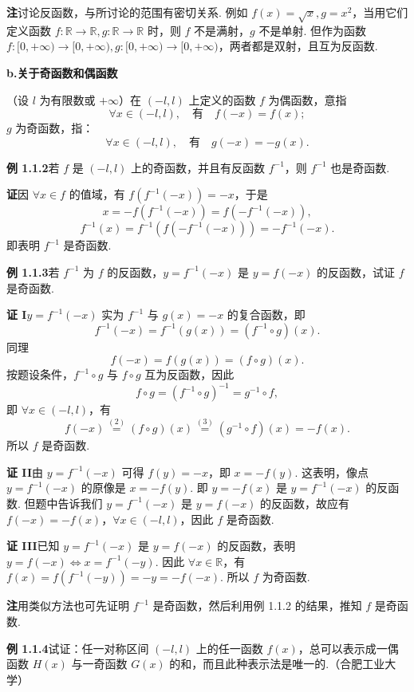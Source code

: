 \documentclass[UTF8, 12pt, fontset=fandol, oneside]{ctexart}
\begin{document}
\noindent\textbf{注}\quad 讨论反函数，与所讨论的范围有密切关系. 例如 $f(x)=\sqrt{x},g=x^2$，当用它们定义函数 $f:\mathbb{R}\to\mathbb{R},g:\mathbb{R}\to\mathbb{R}$ 时，则 $f$ 不是满射，$g$ 不是单射. 但作为函数 $f:[0,+\infty)\to[0,+\infty),g:[0,+\infty)\to[0,+\infty)$，两者都是双射，且互为反函数.

\noindent\textbf{b.\quad 关于奇函数和偶函数}

（设 $l$ 为有限数或 $+\infty$）在 $(-l,l)$ 上定义的函数 $f$ 为偶函数，意指
\[
  \forall x\in(-l,l),\quad \text{有}\quad f(-x)=f(x);
\]
$g$ 为奇函数，指：
\[
  \forall x\in(-l,l),\quad \text{有}\quad g(-x)=-g(x).
\]

\noindent\textbf{例 1.1.2}\quad 若 $f$ 是 $(-l,l)$ 上的奇函数，并且有反函数 $f^{-1}$，则 $f^{-1}$ 也是奇函数.

\noindent\textbf{证}\quad 因 $\forall x\in f$ 的值域，有 $f(f^{-1}(-x))=-x$，于是
\[
  x=-f(f^{-1}(-x))=f(-f^{-1}(-x)),
\]
\[
  f^{-1}(x)=f^{-1}(f(-f^{-1}(-x)))=-f^{-1}(-x).
\]
即表明 $f^{-1}$ 是奇函数.

\noindent\textbf{例 1.1.3}\quad 若 $f^{-1}$ 为 $f$ 的反函数，$y=f^{-1}(-x)$ 是 $y=f(-x)$ 的反函数，试证 $f$ 是奇函数.

\noindent\textbf{证 I}\quad $y=f^{-1}(-x)$ 实为 $f^{-1}$ 与 $g(x)=-x$ 的复合函数，即
\[
  f^{-1}(-x)=f^{-1}(g(x))=(f^{-1}\circ g)(x).
\tag{1}
\]
同理
\[
  f(-x)=f(g(x))=(f\circ g)(x).
\tag{2}
\]
按题设条件，$f^{-1}\circ g$ 与 $f\circ g$ 互为反函数，因此
\[
  f\circ g=(f^{-1}\circ g)^{-1}=g^{-1}\circ f,
\tag{3}
\]
即 $\forall x\in(-l,l)$，有
\[
  f(-x)\stackrel{(2)}{=}(f\circ g)(x)\stackrel{(3)}{=}(g^{-1}\circ f)(x)=-f(x).
\]
所以 $f$ 是奇函数.

\noindent\textbf{证 II}\quad 由 $y=f^{-1}(-x)$ 可得 $f(y)=-x$，即 $x=-f(y)$. 这表明，像点 $y=f^{-1}(-x)$ 的原像是 $x=-f(y)$. 即 $y=-f(x)$ 是 $y=f^{-1}(-x)$ 的反函数. 但题中告诉我们 $y=f^{-1}(-x)$ 是 $y=f(-x)$ 的反函数，故应有 $f(-x)=-f(x)$，$\forall x\in(-l,l)$，因此 $f$ 是奇函数.

\noindent\textbf{证 III}\quad 已知 $y=f^{-1}(-x)$ 是 $y=f(-x)$ 的反函数，表明 $y=f(-x)\Leftrightarrow x=f^{-1}(-y)$. 因此 $\forall x\in\mathbb{R}$，有 $f(x)=f(f^{-1}(-y))=-y=-f(-x)$. 所以 $f$ 为奇函数.

\noindent\textbf{注}\quad 用类似方法也可先证明 $f^{-1}$ 是奇函数，然后利用例 1.1.2 的结果，推知 $f$ 是奇函数.

\noindent\textbf{例 1.1.4}\quad 试证：任一对称区间 $(-l,l)$ 上的任一函数 $f(x)$，总可以表示成一偶函数 $H(x)$ 与一奇函数 $G(x)$ 的和，而且此种表示法是唯一的.（合肥工业大学）
\end{document}
